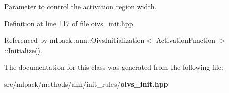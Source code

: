 Parameter to control the activation region width. 



Definition at line 117 of file oivs\+\_\+init.\+hpp.



Referenced by mlpack\+::ann\+::\+Oivs\+Initialization$<$ Activation\+Function $>$\+::\+Initialize().



The documentation for this class was generated from the following file\+:\begin{DoxyCompactItemize}
\item 
src/mlpack/methods/ann/init\+\_\+rules/{\bf oivs\+\_\+init.\+hpp}\end{DoxyCompactItemize}
